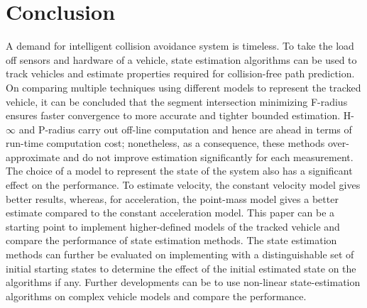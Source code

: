 \chapter{Conclusion} \label{ch:conclusion}
A demand for intelligent collision avoidance system is timeless. To take the load off sensors and hardware of a vehicle, state estimation algorithms can be used to track vehicles and estimate properties required for collision-free path prediction. On comparing multiple techniques using different models to represent the tracked vehicle, it can be concluded that the segment intersection minimizing F-radius ensures faster convergence to more accurate and tighter bounded estimation. H-$\infty$ and P-radius carry out off-line computation and hence are ahead in terms of run-time computation cost; nonetheless, as a consequence, these methods over-approximate and do not improve estimation significantly for each measurement. The choice of a model to represent the state of the system also has a significant effect on the performance. To estimate velocity, the constant velocity model gives better results, whereas, for acceleration, the point-mass model gives a better estimate compared to the constant acceleration model. This paper can be a starting point to implement higher-defined models of the tracked vehicle and compare the performance of state estimation methods. The state estimation methods can further be evaluated on implementing with a distinguishable set of initial starting states to determine the effect of the initial estimated state on the algorithms if any. Further developments can be to use non-linear state-estimation algorithms on complex vehicle models and compare the performance.